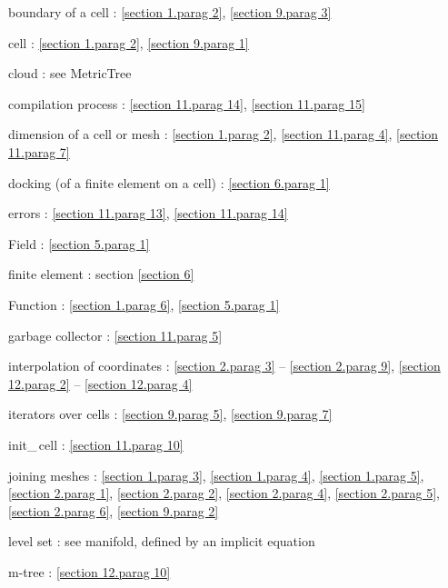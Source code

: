 \documentclass[a4paper]{scrreprt}
\def\numb{}
\newcommand\verm[1]{\textcolor{manif}{#1}}
\renewcommand\tt{\normalfont\ttfamily}
\begin{document}

\noindent
boundary of a cell : \ref{\numb section 1.\numb parag 2}, \ref{\numb section 9.\numb parag 3}

\noindent
cell : \ref{\numb section 1.\numb parag 2}, \ref{\numb section 9.\numb parag 1}

\noindent
cloud : see {\small\tt \verm{MetricTree}}

\noindent
compilation process : \ref{\numb section 11.\numb parag 14},
\ref{\numb section 11.\numb parag 15}

\noindent
dimension of a cell or mesh : \ref{\numb section 1.\numb parag 2},
\ref{\numb section 11.\numb parag 4}, \ref{\numb section 11.\numb parag 7}

\noindent
docking (of a finite element on a cell) : \ref{\numb section 6.\numb parag 1}

\noindent
errors : \ref{\numb section 11.\numb parag 13}, \ref{\numb section 11.\numb parag 14}

\noindent
{\small\tt \verm{Field}} : \ref{\numb section 5.\numb parag 1}

\noindent
finite element : section \ref{\numb section 6}

\noindent
{\small\tt \verm{Function}} : \ref{\numb section 1.\numb parag 6},
\ref{\numb section 5.\numb parag 1}

\noindent
garbage collector : \ref{\numb section 11.\numb parag 5}

\noindent
interpolation of coordinates :
\ref{\numb section 2.\numb parag 3} -- \ref{\numb section 2.\numb parag 9},
\ref{\numb section 12.\numb parag 2} -- \ref{\numb section 12.\numb parag 4}

\noindent
iterators over cells : \ref{\numb section 9.\numb parag 5}, \ref{\numb section 9.\numb parag 7}

\noindent
{\small\tt init\_\,cell} : \ref{\numb section 11.\numb parag 10}

\noindent
{\small\tt join}ing meshes : \ref{\numb section 1.\numb parag 3},
\ref{\numb section 1.\numb parag 4}, \ref{\numb section 1.\numb parag 5},
\ref{\numb section 2.\numb parag 1}, \ref{\numb section 2.\numb parag 2},
\ref{\numb section 2.\numb parag 4}, \ref{\numb section 2.\numb parag 5},
\ref{\numb section 2.\numb parag 6}, \ref{\numb section 9.\numb parag 2}

\noindent
level set : see manifold, defined by an implicit equation

\noindent
m-tree : \ref{\numb section 12.\numb parag 10}
\end{document}
